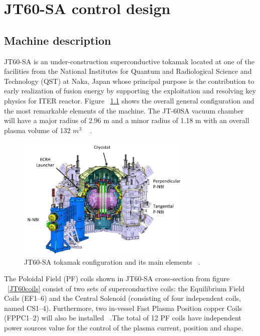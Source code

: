 \chapter{JT60-SA control design}

\section{Machine description}

JT60-SA is an under-construction superconductive tokamak located at one of the facilities from the National Institutes for Quantum and Radiological Science and Technology (QST)  at  Naka, Japan whose principal purpose is  the contribution to early realization of fusion energy by supporting the exploitation and resolving key physics for ITER reactor. Figure ~\ref{JT60schm} shows the overall general configuration and the most remarkable elements of the machine. The JT-60SA  vacuum chamber will have a major radius of 2.96 m and a minor radius of 1.18 m with an overall plasma volume of 132 $m^3$ ~\cite{Spears2014} .
\smallskip

\begin{figure}[h]
	\centering
	\includegraphics[width=0.75\textwidth]{Chp3/JT60SA.png}
	
	\caption{\label{JT60schm}JT60-SA tokamak configuration and its main elements ~\cite{JT60SA:ResearchPlan}.}
\end{figure}

The Poloidal Field (PF) coils shown in JT60-SA cross-section from figure ~\ref{JT60coils} consist of two sets of superconductive coils: the Equilibrium Field Coils (EF1–6) and the Central Solenoid (consisting of four independent coils, named CS1–4). Furthermore, two in-vessel Fast Plasma Position copper Coils (FPPC1–2) will also be installed ~\cite{NCruz}.The total of 12 PF coils have independent power sources value for the control of the plasma current, position and shape.   
\smallskip

